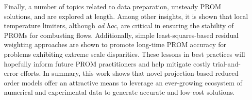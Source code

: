Finally, a number of topics related to data preparation, unsteady PROM solutions, and are explored at length. Among other insights, it is shown that local temperature limiters, although \textit{ad hoc}, are critical in ensuring the stability of PROMs for combusting flows. Additionally, simple least-squares-based residual weighting approaches are shown to promote long-time PROM accuracy for problems exhibiting extreme scale disparities. These lessons in best practices will hopefully inform future PROM practitioners and help mitigate costly trial-and-error efforts. In summary, this work shows that  novel projection-based reduced-order models offer an attractive means to leverage an ever-growing ecosystem of numerical and experimental data to generate accurate and low-cost  solutions.